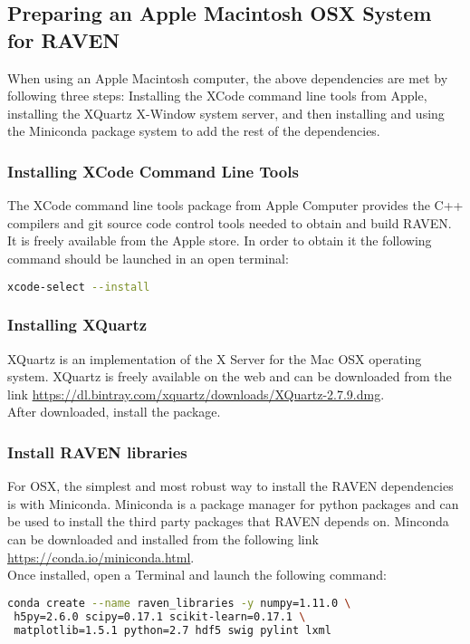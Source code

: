 \goToRavenInstallation

\subsection{Preparing an Apple Macintosh OSX System for RAVEN}
\label{sysprep_osx}

When using an Apple Macintosh computer, the above dependencies are met
by following three steps: Installing the XCode command line tools from Apple,
installing the XQuartz  X-Window system server, and then installing and using the Miniconda
package system to add the rest of the dependencies.

\subsubsection{Installing XCode Command Line Tools}

The XCode command line tools package from Apple Computer provides the C++
compilers and git source code control tools needed to obtain and build RAVEN.
It is freely available from the Apple store. In order to obtain it the following command should be launched in an open terminal:
\begin{lstlisting}[language=bash]
 xcode-select --install
\end{lstlisting}

\subsubsection{Installing XQuartz}
XQuartz is an implementation of the X Server for the Mac OSX operating system.
XQuartz is freely available on the web and can be downloaded from the link
 \url{https://dl.bintray.com/xquartz/downloads/XQuartz-2.7.9.dmg}.
 \\After downloaded, install the package.


\subsubsection{Install RAVEN libraries}
\label{miniconda}

For OSX, the simplest and most robust way to install the RAVEN
dependencies is with Miniconda.  Miniconda is a package manager for
python packages and can be used to install the third party packages
that RAVEN depends on. Minconda can be downloaded and installed from
the following link \url{https://conda.io/miniconda.html}.
\\Once installed, open a Terminal and launch the following command:
\begin{lstlisting}[language=bash]
conda create --name raven_libraries -y numpy=1.11.0 \
 h5py=2.6.0 scipy=0.17.1 scikit-learn=0.17.1 \
 matplotlib=1.5.1 python=2.7 hdf5 swig pylint lxml
\end{lstlisting}

